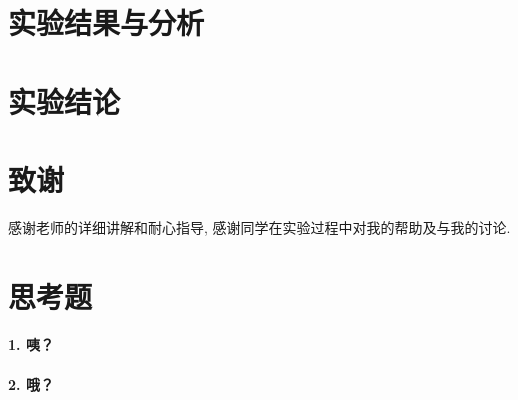 \documentclass[a4paper,UTF8]{ctexart}
\begin{document}
\section{实验结果与分析}

\section{实验结论}


\section{致谢}
感谢老师的详细讲解和耐心指导, 感谢同学在实验过程中对我的帮助及与我的讨论.




\clearpage
\appendix
\section{思考题}
\paragraph{1. 咦？\\}
\paragraph{2. 哦？\\}

\end{document}
